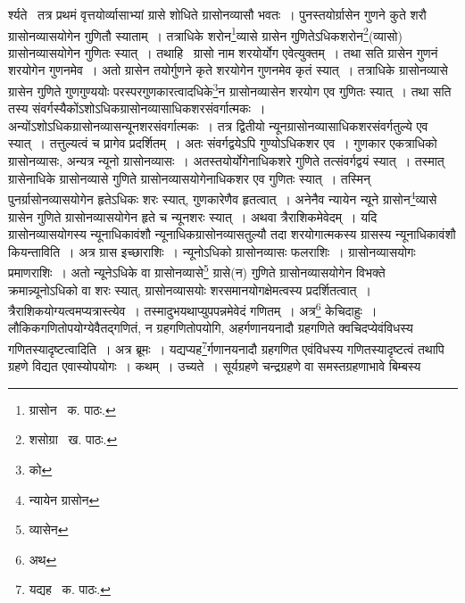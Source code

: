 \documentclass[11pt, openany]{book}
\begin{document}
\noindent र्श्यते \textendash\ तत्र प्रथमं वृत्तयोर्व्यासाभ्यां ग्रासे शोधिते ग्रासोनव्यासौ भवतः~। पुनस्तयोर्ग्रासेन गुणने कुते शरौ ग्रासोनव्यासयोगेन गुणितौ स्याताम्~। तत्राधिके शरोन\renewcommand{\thefootnote}{१}\footnote{ग्रासोन \textendash\ क. पाठः.}व्यासे ग्रासेन गुणितेऽधिकशरोन\renewcommand{\thefootnote}{२}\footnote{शसोग्रा \textendash\ ख. पाठः.}(व्यासो) ग्रासोनव्यासयोगेन गुणितः स्यात्~। तथाहि \textendash\ ग्रासो नाम शरयोर्योग एवेत्युक्तम्~। तथा सति ग्रासेन गुणनं शरयोगेन गुणनमेव~। अतो ग्रासेन तयोर्गुणने कृते शरयोगेन गुणनमेव कृतं स्यात्~। तत्राधिके ग्रासोनव्यासे ग्रासेन गुणिते गुणगुण्ययोः परस्परगुणकारत्वादधिके\renewcommand{\thefootnote}{३}\footnote{को}न ग्रासोनव्यासेन शरयोग एव गुणितः स्यात्~। तथा सति तस्य संवर्गस्यैकोंऽशोऽधिकग्रासोनव्यासाधिकशरसंवर्गात्मकः~। अन्योंऽशोऽधिकग्रासोनव्यासन्यूनशरसंवर्गात्मकः~। तत्र द्वितीयो
न्यूनग्रासोनव्यासाधिकशरसंवर्गतुल्ये एव स्यात्~। तत्तुल्यत्वं च प्रागेव प्रदर्शितम्~। अतः संवर्गद्वयेऽपि गुण्योऽधिकशर एव~। गुणकार एकत्राधिको ग्रासोनव्यासः, अन्यत्र न्यूनो ग्रासोनव्यासः~। अतस्तयोर्योगेनाधिकशरे गुणिते तत्संवर्गद्वयं स्यात्~। तस्मात् ग्रासेनाधिके ग्रासोनव्यासे गुणिते ग्रासोनव्यासयोगेनाधिकशर एव गुणितः स्यात्~। तस्मिन् पुनर्ग्रासोनव्यासयोगेन हृतेऽधिकः शरः स्यात्, गुणकारेणैव हृतत्वात्~। अनेनैव न्यायेन न्यूने ग्रासोन\renewcommand{\thefootnote}{४}\footnote{न्यायेन ग्रासोन}व्यासे ग्रासेन गुणिते ग्रासोनव्यासयोगेन हृते च न्यूनशरः स्यात्~। अथवा त्रैराशिकमेवेदम्~। यदि ग्रासोनव्यासयोगस्य न्यूनाधिकावंशौ न्यूनाधिकग्रासोनव्यासतुल्यौ तदा शरयोगात्मकस्य ग्रासस्य न्यूनाधिकावंशौ कियन्ताविति~। अत्र ग्रास इच्छाराशिः~। न्यूनोऽधिको ग्रासोनव्यासः फलराशिः~। ग्रासोनव्यासयोगः प्रमाणराशिः~। अतो न्यूनेऽधिके वा ग्रासोनव्यासे\renewcommand{\thefootnote}{५}\footnote{व्यासेन} ग्रासे(न) गुणिते ग्रासोनव्यासयोगेन विभक्ते क्रमान्न्यूनोऽधिको वा शरः स्यात्, ग्रासोनव्यासयोः शरसमानयोगक्षेमत्वस्य प्रदर्शितत्वात्~। त्रैराशिकयोग्यत्वमप्यत्रास्त्येव~। तस्मादुभयथाप्युपपन्नमेवेदं गणितम्~। अत्र\renewcommand{\thefootnote}{६}\footnote{अथ} केचिदाहुः~। लौकिकगणितोपयोग्येवैतद्गणितं, न ग्रहगणितोपयोगि, अहर्गणानयनादौ ग्रहगणिते क्वचिदप्येवंविधस्य गणितस्यादृष्टत्वादिति~। अत्र ब्रूमः~। यद्यप्यह\renewcommand{\thefootnote}{७}\footnote{यद्यह \textendash\ क. पाठः.}र्गणानयनादौ ग्रहगणित एवंविधस्य गणितस्यादृष्टत्वं तथापि ग्रहणे विद्यत एवास्योपयोगः~। कथम्~। उच्यते~। सूर्यग्रहणे चन्द्रग्रहणे वा समस्तग्रहणाभावे बिम्बस्य

\newpage
\end{document}
